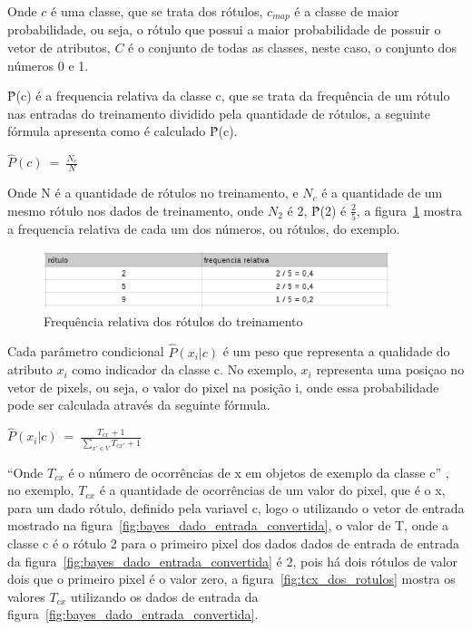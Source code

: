 Onde $c$ é uma classe, que se trata dos rótulos, $c_{map}$ é a classe de maior
probabilidade, ou seja, o rótulo que possui a maior probabilidade de possuir o vetor
de atributos, $C$ é o conjunto de todas as classes, neste caso, o conjunto dos números
0 e 1.

{\^P}(c) é a frequencia relativa da classe c, que se trata da frequência de um rótulo
nas entradas do treinamento dividido pela quantidade de rótulos, a seguinte fórmula
apresenta como é calculado {\^P}(c).

\begin{center}

$ \hat{P}(c) \ = \ \frac{N_c}{N} $
\\
\end{center}

Onde N é a quantidade de rótulos no treinamento, e $N_c$ é a quantidade de um mesmo
rótulo nos dados de treinamento, onde $N_{2}$ é 2, {\^P}(2) é $\frac{2}{5}$, a
figura~\ref{fig:frequencia_relativa} mostra a frequencia relativa de  cada um dos
números, ou rótulos, do exemplo.

\begin{figure}[h]
  \centering
  \includegraphics[width=0.9\textwidth]{figuras/frequencia_relativa.eps}
  \caption{Frequência relativa dos rótulos do treinamento}
  \label{fig:frequencia_relativa}
\end{figure}

Cada parâmetro condicional $\hat{P}(x_i | c)$ é um peso que representa a qualidade
do atributo $x_i$ como indicador da classe c. No exemplo, $x_i$ representa uma
posiçao no vetor de pixels, ou seja, o valor do pixel na posição i, onde essa
probabilidade pode ser calculada através da seguinte fórmula.

\begin{center}

$ \hat{P}(x_i | c) \ = \ \frac{T_{cx} + 1}{\sum\limits_{x' \in V}T_{cx'} + 1} $
\\
\end{center}

``Onde $T_{cx}$ é o número de ocorrências de x em objetos de exemplo da classe c''
, no exemplo, $T_{cx}$ é a quantidade de
ocorrências de um valor do pixel, que é o x, para um dado rótulo, definido pela
variavel c, logo o utilizando o vetor de entrada mostrado na figura~\ref{fig:bayes_dado_entrada_convertida},
o valor de T, onde a classe c é o rótulo 2 para o primeiro pixel dos dados dados
de entrada de entrada da figura~\ref{fig:bayes_dado_entrada_convertida} é 2, pois
há dois rótulos de valor dois que o primeiro pixel é o valor zero, a figura~\ref{fig:tcx_dos_rotulos}
mostra os valores $T_{cx}$ utilizando os dados de entrada da figura~\ref{fig:bayes_dado_entrada_convertida}.

